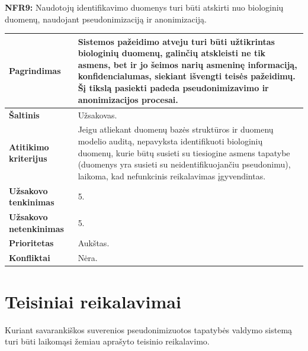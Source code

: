 \documentclass[12pt]{article}
\begin{document}
\noindent \textbf{NFR9:} Naudotojų identifikavimo duomenys turi būti atskirti nuo
biologinių duomenų, naudojant pseudonimizaciją ir anonimizaciją.
\label{sec:NFR9}
\begin{table}[htb!]
    \captionsetup{justification=centering}
    \vskip -10pt
    \begin{tabular}{|m{4.9cm}|m{11cm}|}
        \hline
        \raggedleft \textbf{\cellcolor{deepchampagne}Pagrindimas} &
        Sistemos pažeidimo atveju turi būti užtikrintas biologinių duomenų,
        galinčių atskleisti ne tik asmens, bet ir jo šeimos narių asmeninę
        informaciją, konfidencialumas, siekiant išvengti teisės pažeidimų. Šį
        tikslą pasiekti padeda pseudonimizavimo ir anonimizacijos procesai. \\
        \hline
        \raggedleft \textbf{\cellcolor{deepchampagne}Šaltinis} & Užsakovas. \\
        \hline
        \raggedleft \textbf{\cellcolor{deepchampagne}Atitikimo kriterijus} & 
        Jeigu atliekant duomenų bazės struktūros ir duomenų modelio auditą,
        nepavyksta identifikuoti biologinių duomenų, kurie būtų susieti su
        tiesiogine asmens tapatybe (duomenys yra susieti su neidentifikuojančiu
        pseudonimu), laikoma, kad nefunkcinis reikalavimas įgyvendintas. \\
        \hline
        \raggedleft \textbf{\cellcolor{deepchampagne}Užsakovo tenkinimas} & 5. \\
        \hline
        \raggedleft \textbf{\cellcolor{deepchampagne}Užsakovo netenkinimas} & 5. \\
        \hline
        \raggedleft \textbf{\cellcolor{deepchampagne}Prioritetas} & Aukštas. \\
        \hline
        \raggedleft \textbf{\cellcolor{deepchampagne}Konfliktai} & Nėra. \\
        \hline
    \end{tabular}
\end{table}

\newpage

\section{Teisiniai reikalavimai}
Kuriant savarankiškos suverenios pseudonimizuotos tapatybės valdymo sistemą
turi būti laikomąsi žemiau aprašyto teisinio reikalavimo.
\vskip 10pt
\end{document}
